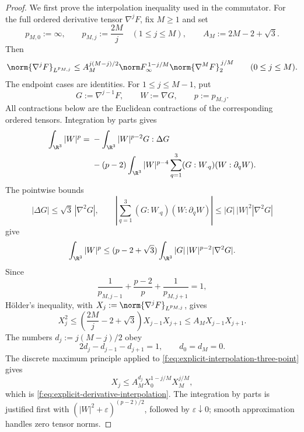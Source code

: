 \begin{proof}
We first prove the interpolation inequality used in the commutator.  For the
full ordered derivative tensor \(\nabla^jF\), fix \(M\ge1\) and set
\[
 p_{M,0}:=\infty,
 \qquad
 p_{M,j}:=\frac{2M}{j}\quad(1\le j\le M),
 \qquad
 A_M:=2M-2+\sqrt3.
\]
Then
\begin{equation}
 \norm{\nabla^jF}_{L^{p_{M,j}}}
 \le A_M^{j(M-j)/2}
 \norm F_\infty^{\,1-j/M}
 \norm{\nabla^MF}_2^{\,j/M}
 \qquad(0\le j\le M).
 \label{f:eq:explicit-derivative-interpolation}
\end{equation}
The endpoint cases are identities.  For \(1\le j\le M-1\), put
\[
 G:=\nabla^{j-1}F,
 \qquad W:=\nabla G,
 \qquad p:=p_{M,j}.
\]
All contractions below are the Euclidean contractions of the corresponding
ordered tensors.  Integration by parts gives
\begin{align*}
 \int_{\R^3}|W|^p
 ={}&-\int_{\R^3}|W|^{p-2}G:\Delta G\\
 &-(p-2)\int_{\R^3}|W|^{p-4}
   \sum_{q=1}^3(G:W_{\cdot q})(W:\partial_qW).
\end{align*}
The pointwise bounds
\[
 |\Delta G|\le\sqrt3\,|\nabla^2G|,
 \qquad
 \left|\sum_{q=1}^3(G:W_{\cdot q})(W:\partial_qW)\right|
 \le |G|\,|W|^2|\nabla^2G|
\]
give
\[
 \int_{\R^3}|W|^p
 \le(p-2+\sqrt3)
 \int_{\R^3}|G|\,|W|^{p-2}|\nabla^2G|.
\]
Since
\[
 \frac1{p_{M,j-1}}+\frac{p-2}{p}
 +\frac1{p_{M,j+1}}=1,
\]
H\"older's inequality, with
\(
 X_j:=\norm{\nabla^jF}_{L^{p_{M,j}}}
\), gives
\begin{equation}
 X_j^2
 \le\left(\frac{2M}{j}-2+\sqrt3\right)X_{j-1}X_{j+1}
 \le A_MX_{j-1}X_{j+1}.
 \label{f:eq:explicit-interpolation-three-point}
\end{equation}
The numbers \(d_j:=j(M-j)/2\) obey
\[
 2d_j-d_{j-1}-d_{j+1}=1,
 \qquad d_0=d_M=0.
\]
The discrete maximum principle applied to
\eqref{f:eq:explicit-interpolation-three-point} gives
\[
 X_j\le A_M^{d_j}X_0^{1-j/M}X_M^{j/M},
\]
which is \eqref{f:eq:explicit-derivative-interpolation}.  The integration by
parts is justified first with
\((|W|^2+\varepsilon)^{(p-2)/2}\), followed by
\(\varepsilon\downarrow0\); smooth approximation handles zero tensor norms.


\end{proof}
